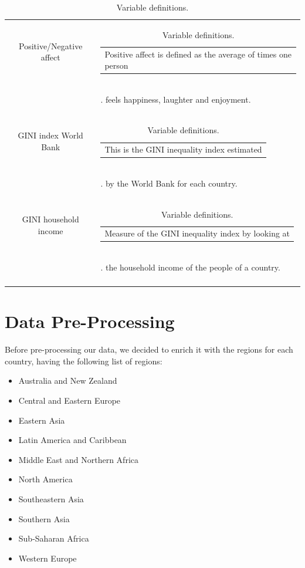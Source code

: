 \documentclass[12pt]{extarticle}
\begin{document}
\begin{longtable}[c]{cl}
             Positive/Negative affect & \begin{tabular}{@{}l@{}}Positive affect is defined as the average of times one person  \end{tabular} \\
             & \begin{tabular}. feels happiness, laughter and enjoyment.\end{tabular}\\
             \hline
             
             GINI index World Bank & \begin{tabular}{@{}l@{}}This is the GINI inequality index estimated \end{tabular} \\
             & \begin{tabular}.  by the World Bank for each country.\end{tabular}\\\hline
             
             GINI household income & \begin{tabular}{@{}l@{}}Measure of the GINI inequality index by looking at \end{tabular} \\
             & \begin{tabular}.  the household income of the people of a country.\end{tabular}\\\hline

    \caption{Variable definitions.}
    \label{variables}
\end{longtable}

\newpage
\section{Data Pre-Processing}

Before pre-processing our data, we decided to enrich it with the regions for each country, having the following list of regions:

\begin{itemize}
    \item Australia and New Zealand
    \item Central and Eastern Europe
    \item Eastern Asia
    \item Latin America and Caribbean
    \item Middle East and Northern Africa
    \item North America
    \item Southeastern Asia
    \item Southern Asia
    \item Sub-Saharan Africa
    \item Western Europe
\end{itemize}
\end{document}
